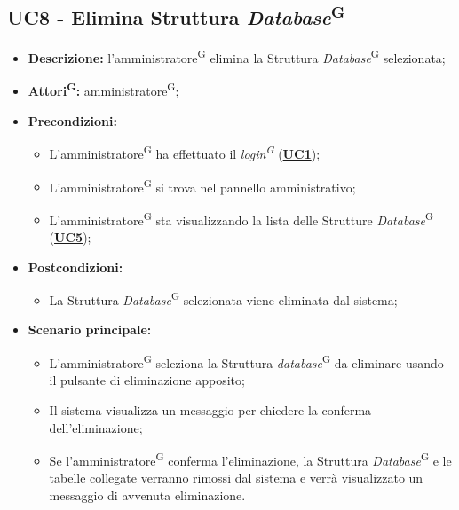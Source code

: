 \subsection{UC8 - Elimina Struttura \textit{Database}\textsuperscript{G}}
\label{sec:UC8}
\begin{itemize}
	\item \textbf{Descrizione:} l’amministratore\textsuperscript{G} elimina la Struttura \textit{Database}\textsuperscript{G} selezionata;
	\item \textbf{Attori\textsuperscript{G}:} amministratore\textsuperscript{G};
	\item \textbf{Precondizioni:} 
	\begin{itemize}
		\item L’amministratore\textsuperscript{G} ha effettuato il \textit{login\textsuperscript{G}} (\hyperref[sec:UC1]{\textbf{UC1}});
		\item L’amministratore\textsuperscript{G} si trova nel pannello amministrativo;
		\item L’amministratore\textsuperscript{G} sta visualizzando la lista delle Strutture \textit{Database}\textsuperscript{G} (\hyperref[sec:UC5]{\textbf{UC5}});
	\end{itemize}
	\item \textbf{Postcondizioni:} 
	\begin{itemize}
		\item La Struttura \textit{Database}\textsuperscript{G} selezionata viene eliminata dal sistema;
	\end{itemize}
	\item \textbf{Scenario principale:} 
	\begin{itemize}
		\item L'amministratore\textsuperscript{G} seleziona la Struttura \textit{database}\textsuperscript{G} da eliminare usando il pulsante di eliminazione apposito;
		\item Il sistema visualizza un messaggio per chiedere la conferma dell'eliminazione;
		\item Se l'amministratore\textsuperscript{G} conferma l'eliminazione, la Struttura \textit{Database}\textsuperscript{G} e le tabelle collegate verranno rimossi dal sistema e verrà visualizzato un messaggio di avvenuta eliminazione.
	\end{itemize}
\end{itemize}

